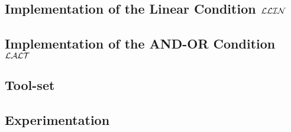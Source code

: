    \subsection{Implementation of the Linear Condition $\mathcal{LLIN}$}
   \label{s:implLin}
   
   
   \subsection{Implementation of the AND-OR Condition $\mathcal{LALT}$}
   \label{s:implANDOR}
   

   \subsection{Tool-set}
   \label{s:tools}
   

   \subsection{Experimentation}
   \label{s:experiments}
   

